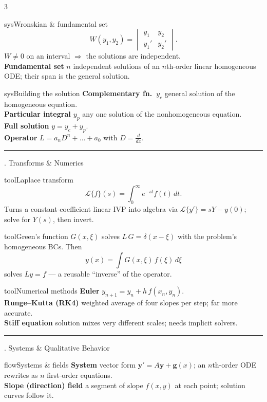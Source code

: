 \documentclass[10pt]{article}
\newcommand{\lab}[1]{\textcolor{ink}{\sffamily\footnotesize\textbf{#1}}\;}
\newcommand{\sect}[2]{%
  \begin{tcolorbox}[blanker, breakable, before skip=2pt, after skip=2pt]
  \begingroup\sffamily\bfseries\normalsize\color{#1}%
  {\color{#1}\rule[-1pt]{3pt}{12pt}}\;#2\endgroup
  \par\vspace{1pt}{\color{#1}\hrule height 1pt}
  \end{tcolorbox}}
\begin{document}
\begin{multicols}{3}
\begin{card}{sys}{Wronskian \& fundamental set}
\[
W(y_1,y_2)=\begin{vmatrix} y_1 & y_2\\ y_1' & y_2' \end{vmatrix}.
\]
$W\neq 0$ on an interval $\Rightarrow$ the solutions are independent.\\
\lab{Fundamental set} $n$ independent solutions of an $n$th-order linear homogeneous ODE; their span is the general solution.
\end{card}

\begin{card}{sys}{Building the solution}
\lab{Complementary fn.\ $y_c$} general solution of the homogeneous equation.\\
\lab{Particular integral $y_p$} any one solution of the nonhomogeneous equation.\\
\lab{Full solution} $y=y_c+y_p$.\\
\lab{Operator} $L=a_nD^n+\dots+a_0$ with $D=\tfrac{d}{dx}$.
\end{card}

\sect{tool}{9.\; Transforms \& Numerics}

\begin{card}{tool}{Laplace transform}
\[
\mathcal{L}\{f\}(s)=\int_0^{\infty} e^{-st} f(t)\,dt .
\]
Turns a constant-coefficient linear IVP into algebra via $\mathcal{L}\{y'\}=sY-y(0)$; solve for $Y(s)$, then invert.
\end{card}

\begin{card}{tool}{Green's function}
$G(x,\xi)$ solves $L\,G=\delta(x-\xi)$ with the problem's homogeneous BCs. Then
\[
y(x)=\int G(x,\xi)\,f(\xi)\,d\xi
\]
solves $Ly=f$ --- a reusable ``inverse'' of the operator.
\end{card}

\begin{card}{tool}{Numerical methods}
\lab{Euler} $y_{n+1}=y_n+h\,f(x_n,y_n)$.\\
\lab{Runge--Kutta (RK4)} weighted average of four slopes per step; far more accurate.\\
\lab{Stiff equation} solution mixes very different scales; needs implicit solvers.
\end{card}

\sect{flow}{10.\; Systems \& Qualitative Behavior}

\begin{card}{flow}{Systems \& fields}
\lab{System} vector form $\mathbf{y}'=A\mathbf{y}+\mathbf{g}(x)$; an $n$th-order ODE rewrites as $n$ first-order equations.\\
\lab{Slope (direction) field} a segment of slope $f(x,y)$ at each point; solution curves follow it.
\end{card}


\end{multicols}
\end{document}
